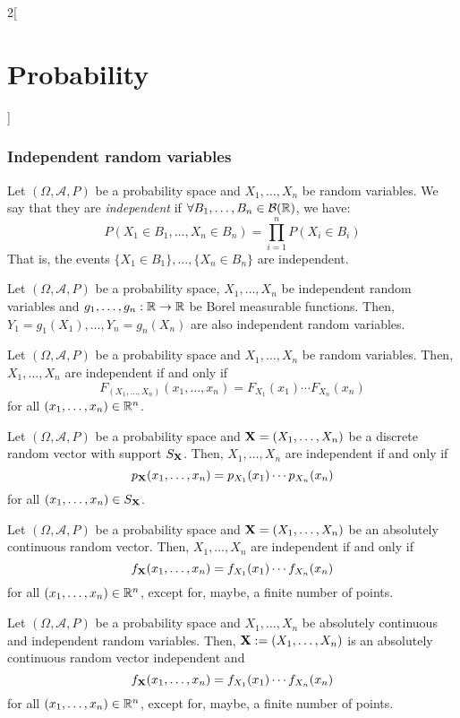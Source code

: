 \documentclass[../../../main.tex]{subfiles}
\begin{document}
\begin{multicols}{2}[\section{Probability}]
  \subsubsection{Independent random variables}
  \begin{definition}
    Let $(\Omega,\mathcal{A},P)$ be a probability space and $X_1,\ldots,X_n$ be random variables. We say that they are \textit{independent} if $\forall B_1,\ldots,B_n\in\mathcal{B}(\mathbb{R})$, we have: $$P(X_1\in B_1,\ldots,X_n\in B_n)=\prod_{i=1}^nP(X_i\in B_i)$$ That is, the events $\{X_1\in B_1\},\ldots,\{X_n\in B_n\}$ are independent.
  \end{definition}
  \begin{prop}
    Let $(\Omega,\mathcal{A},P)$ be a probability space, $X_1,\ldots,X_n$ be independent random variables and $g_1,\ldots,g_n:\mathbb{R}\rightarrow\mathbb{R}$ be Borel measurable functions. Then, $Y_1=g_1(X_1),\ldots,Y_n=g_n(X_n)$ are also independent random variables.
  \end{prop}
  \begin{prop}
    Let $(\Omega,\mathcal{A},P)$ be a probability space and $X_1,\ldots,X_n$ be random variables. Then, $X_1,\ldots,X_n$ are independent if and only if $$F_{(X_1,\ldots,X_n)}(x_1,\ldots,x_n)=F_{X_1}(x_1)\cdots F_{X_n}(x_n)$$ for all $(x_1,\ldots,x_n)\in\mathbb{R}^n$.
  \end{prop}
  \begin{prop}
    Let $(\Omega,\mathcal{A},P)$ be a probability space and $\boldsymbol{\mathrm{X}}=(X_1,\ldots,X_n)$ be a discrete random vector with support $S_{\boldsymbol{\mathrm{X}}}$. Then, $X_1,\ldots,X_n$ are independent if and only if $$p_{\boldsymbol{\mathrm{X}}}(x_1,\ldots,x_n)=p_{X_1}(x_1)\cdots p_{X_n}(x_n)$$ for all $(x_1,\ldots,x_n)\in S_{\boldsymbol{\mathrm{X}}}$.
  \end{prop}
  \begin{prop}
    Let $(\Omega,\mathcal{A},P)$ be a probability space and $\boldsymbol{\mathrm{X}}=(X_1,\ldots,X_n)$ be an absolutely continuous random vector. Then, $X_1,\ldots,X_n$ are independent if and only if $$f_{\boldsymbol{\mathrm{X}}}(x_1,\ldots,x_n)=f_{X_1}(x_1)\cdots f_{X_n}(x_n)$$ for all $(x_1,\ldots,x_n)\in \mathbb{R}^n$, except for, maybe, a finite number of points.
  \end{prop}
  \begin{prop}
    Let $(\Omega,\mathcal{A},P)$ be a probability space and $X_1,\ldots,X_n$ be absolutely continuous and independent random variables. Then, $\boldsymbol{\mathrm{X}}:=(X_1,\ldots,X_n)$ is an absolutely continuous random vector independent and $$f_{\boldsymbol{\mathrm{X}}}(x_1,\ldots,x_n)=f_{X_1}(x_1)\cdots f_{X_n}(x_n)$$ for all $(x_1,\ldots,x_n)\in \mathbb{R}^n$, except for, maybe, a finite number of points.
  \end{prop}

\end{multicols}
\end{document}
